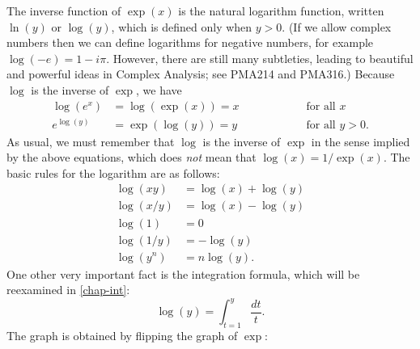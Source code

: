 \documentclass[a4paper]{book}
\newcommand{\RED}[1]{{\color{red}#1}}
\renewcommand{\:}{\colon}
\newcommand{\PMA}[1]{PMA#1}
\newcommand{\EMPH}[1]{\RED{\emph{#1}}}
\theoremstyle{definition}
\begin{document}
The inverse function of $\exp(x)$ is the natural logarithm function,
written $\ln(y)$ or $\log(y)$, which is defined only when $y>0$.  (If
we allow complex numbers then we can define logarithms for negative
numbers, for example $\log(-e)=1-i\pi$.  However, there are still many
subtleties, leading to beautiful and powerful ideas in Complex
Analysis; see \PMA{214} and \PMA{316}.)  Because $\log$ is the inverse of
$\exp$, we have
\[ \begin{array}{rllll}
  \log(e^x)   &= \log(\exp(x)) = x & \hspace{4em} & \text{ for all } x \\
  e^{\log(y)} &= \exp(\log(y)) = y & & \text{ for all } y>0.
\end{array} \]
As usual, we must remember that $\log$ is the inverse of $\exp$ in the
sense implied by the above equations, which does \EMPH{not} mean that
$\log(x)=1/\exp(x)$.  The basic rules for the logarithm are as
follows:
\begin{align*}
 \log(xy)  &= \log(x) + \log(y) \\
 \log(x/y) &= \log(x) - \log(y) \\
 \log(1)   &= 0 \\
 \log(1/y) &= -\log(y) \\
 \log(y^n) &= n\log(y).
\end{align*}
One other very important fact is the integration formula, which will
be reexamined in \autoref{chap-int}:
\[ \log(y) = \int_{t=1}^y \frac{dt}{t}. \]
The graph is obtained by flipping the graph of $\exp$:
\begin{center}
\end{center}
\end{document}
